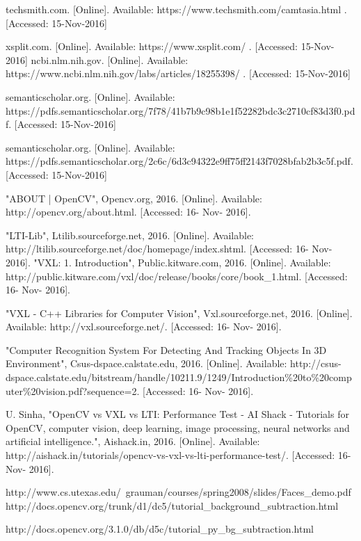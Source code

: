 \documentclass[letterpaper,10pt,onecolumn,draftclsnofoot]{IEEEtran}
\begin{document}
\begin{thebibliography}{99}
techsmith.com. [Online]. Available: https://www.techsmith.com/camtasia.html . [Accessed: 15-Nov-2016]

xsplit.com. [Online]. Available: https://www.xsplit.com/ . [Accessed: 15-Nov-2016]
 ncbi.nlm.nih.gov. [Online]. Available: https://www.ncbi.nlm.nih.gov/labs/articles/18255398/ . [Accessed: 15-Nov-2016]

semanticscholar.org. [Online]. Available: https://pdfs.semanticscholar.org/7f78/41b7b9c98b1e1f52282bdc3c2710cf83d3f0.pdf. [Accessed: 15-Nov-2016]

 semanticscholar.org. [Online]. Available: https://pdfs.semanticscholar.org/2c6c/6d3c94322e9ff75ff2143f7028bfab2b3c5f.pdf. [Accessed: 15-Nov-2016]

"ABOUT | OpenCV", Opencv.org, 2016. [Online]. Available: http://opencv.org/about.html. [Accessed: 16- Nov- 2016].

"LTI-Lib", Ltilib.sourceforge.net, 2016. [Online]. Available: http://ltilib.sourceforge.net/doc/homepage/index.shtml. [Accessed: 16- Nov- 2016].
"VXL: 1. Introduction", Public.kitware.com, 2016. [Online]. Available: http://public.kitware.com/vxl/doc/release/books/core/book\_1.html. [Accessed: 16- Nov- 2016].

"VXL - C++ Libraries for Computer Vision", Vxl.sourceforge.net, 2016. [Online]. Available: http://vxl.sourceforge.net/. [Accessed: 16- Nov- 2016].

"Computer Recognition System For Detecting And Tracking Objects In 3D Environment", Csus-dspace.calstate.edu, 2016. [Online]. Available: http://csus-dspace.calstate.edu/bitstream/handle/10211.9/1249/Introduction\%20to\%20computer\%20vision.pdf?sequence=2. [Accessed: 16- Nov- 2016].

U. Sinha, "OpenCV vs VXL vs LTI: Performance Test - AI Shack - Tutorials for OpenCV, computer vision, deep learning, image processing, neural networks and artificial intelligence.", Aishack.in, 2016. [Online]. Available: http://aishack.in/tutorials/opencv-vs-vxl-vs-lti-performance-test/. [Accessed: 16- Nov- 2016].

http://www.cs.utexas.edu/~grauman/courses/spring2008/slides/Faces\_demo.pdf
http://docs.opencv.org/trunk/d1/dc5/tutorial\_background\_subtraction.html

http://docs.opencv.org/3.1.0/db/d5c/tutorial\_py\_bg\_subtraction.html


\end{thebibliography}
\end{document}
